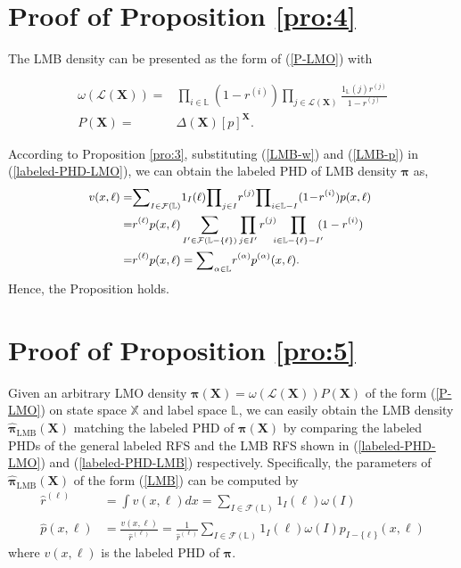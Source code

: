 \documentclass[journal]{IEEEtran}
\newcommand{\bX}{{\mathbf X}}
\newcommand{\bpi}{{\boldsymbol\pi}}
\begin{document}
{\section{Proof of Proposition \ref{pro:4}}
The LMB density can  be presented as the form of (\ref{P-LMO}) with
\begin{small}
\begin{align}
\label{LMB-w}\omega(\mathcal{L}(\bX))=&{\prod}_{i\in\mathbb{L}}(1-r^{(i)}){\prod}_{j\in \mathcal{L}(\bX) }\frac{1_{\mathbb{L}}(j)r^{(j)}}{1-r^{(j)}}\\
\label{LMB-p}P(\bX)=&\Delta(\bX)[p]^\bX.
\end{align}
\end{small}
According to Proposition \ref{pro:3}, substituting (\ref{LMB-w}) and (\ref{LMB-p})  in (\ref{labeled-PHD-LMO}), we can obtain the labeled PHD of LMB density $\bpi$ as,
\begin{equation}\label{labeled-PHD-LMB-proof}
{\small
\begin{split}
\!\!v(x,\ell)=&
{\sum}_{I\in\mathcal{F}(\mathbb{L})}1_{I}(\ell){\prod}_{j\in I }r^{(j)}{\prod}_{i\in\mathbb{L}-I}(1\!-\!r^{(i)})p(x,\ell)\\
=&r^{(\ell)}p(x,\ell)\sum_{I'\in\mathcal{F}(\mathbb{L}-\{\ell\})}\prod_{j\in I' }r^{(j)}\!\!\!\prod_{i\in \mathbb{L}-\{\ell\}-I'}\!\!\!(1-r^{(i)})
\\
=&r^{(\ell)}p(x,\ell)={\sum}_{\alpha\in\mathbb{L}}r^{(\alpha)}p^{(\alpha)}(x,\ell).
\end{split}}
\end{equation}
Hence, the Proposition holds.


\section{Proof of Proposition \ref{pro:5}}
Given an arbitrary LMO density $\bpi(\bX)=\omega(\mathcal{L}(\bX))P(\bX)$ of the form (\ref{P-LMO}) on state space $\mathbb{X}$ and label space $\mathbb{L}$, we can easily obtain  the  LMB density  $\hat \bpi_{\text{LMB}}(\bX)$ 
matching the   labeled PHD  of $\bpi(\bX)$ by comparing  the labeled PHDs  of the general labeled RFS and the LMB RFS shown in (\ref{labeled-PHD-LMO}) and (\ref{labeled-PHD-LMB}) respectively.
Specifically, the parameters of  $\hat\bpi_{\text{LMB}}(\bX)$ of the form (\ref{LMB})
can be computed by
\begin{align}
\label{existence_probability}
  \hat{r}^{(\ell)}&=\int v(x,\ell) dx={\sum}_{I\in\mathcal{F}(\mathbb{L})}1_{I}(\ell)\omega(I)\\
\label{probability_density}
 \hat{p}(x,\ell)&=\frac{v(x,\ell)}{ \hat{r}^{(\ell)}}=\frac{1}{ \hat{r}^{(\ell)}}{\sum}_{I\in\mathcal{F}(\mathbb{L})}1_{I}(\ell)\omega(I)p_{I-\{\ell\}}(x,\ell)
\end{align}
where $v(x,\ell)$ is the labeled PHD of $\bpi$.

}
\end{document}
